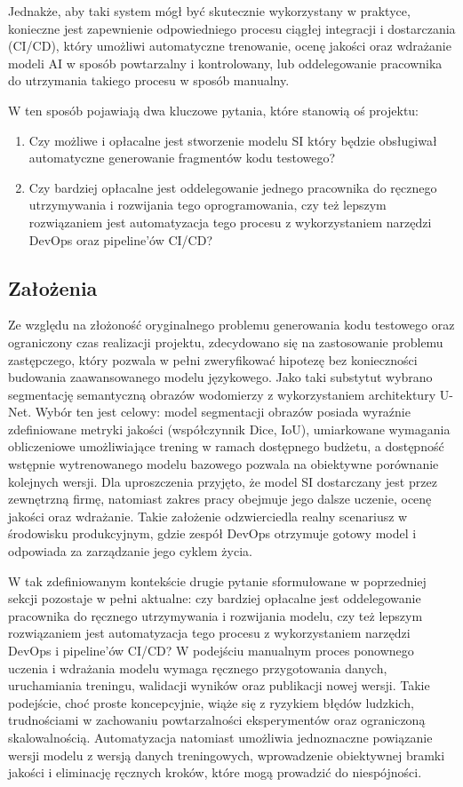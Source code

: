 Jednakże, aby taki system mógł być skutecznie wykorzystany w praktyce, konieczne jest zapewnienie odpowiedniego procesu ciągłej integracji i dostarczania (CI/CD), który umożliwi automatyczne trenowanie, ocenę jakości oraz wdrażanie modeli AI w sposób powtarzalny i kontrolowany, lub oddelegowanie pracownika do utrzymania takiego procesu w sposób manualny.

W ten sposób pojawiają dwa kluczowe pytania, które stanowią oś projektu:
\begin{enumerate}
  \item Czy możliwe i opłacalne jest stworzenie modelu SI który będzie obsługiwał automatyczne generowanie fragmentów kodu testowego?
  \item Czy bardziej opłacalne jest oddelegowanie jednego pracownika do ręcznego utrzymywania i rozwijania tego oprogramowania, czy też lepszym rozwiązaniem jest automatyzacja tego procesu z wykorzystaniem narzędzi DevOps oraz pipeline’ów CI/CD?
\end{enumerate}

\subsection{Założenia}

Ze względu na złożoność oryginalnego problemu generowania kodu testowego oraz ograniczony czas realizacji projektu, zdecydowano się na zastosowanie problemu zastępczego, który pozwala w pełni zweryfikować hipotezę bez konieczności budowania zaawansowanego modelu językowego. Jako taki substytut wybrano segmentację semantyczną obrazów wodomierzy z wykorzystaniem architektury U-Net. Wybór ten jest celowy: model segmentacji obrazów posiada wyraźnie zdefiniowane metryki jakości (współczynnik Dice, IoU), umiarkowane wymagania obliczeniowe umożliwiające trening w ramach dostępnego budżetu, a dostępność wstępnie wytrenowanego modelu bazowego pozwala na obiektywne porównanie kolejnych wersji. Dla uproszczenia przyjęto, że model SI dostarczany jest przez zewnętrzną firmę, natomiast zakres pracy obejmuje jego dalsze uczenie, ocenę jakości oraz wdrażanie. Takie założenie odzwierciedla realny scenariusz w środowisku produkcyjnym, gdzie zespół DevOps otrzymuje gotowy model i odpowiada za zarządzanie jego cyklem życia.

W tak zdefiniowanym kontekście drugie pytanie sformułowane w poprzedniej sekcji pozostaje w pełni aktualne: czy bardziej opłacalne jest oddelegowanie pracownika do ręcznego utrzymywania i rozwijania modelu, czy też lepszym rozwiązaniem jest automatyzacja tego procesu z wykorzystaniem narzędzi DevOps i pipeline'ów CI/CD? W podejściu manualnym proces ponownego uczenia i wdrażania modelu wymaga ręcznego przygotowania danych, uruchamiania treningu, walidacji wyników oraz publikacji nowej wersji. Takie podejście, choć proste koncepcyjnie, wiąże się z ryzykiem błędów ludzkich, trudnościami w zachowaniu powtarzalności eksperymentów oraz ograniczoną skalowalnością. Automatyzacja natomiast umożliwia jednoznaczne powiązanie wersji modelu z wersją danych treningowych, wprowadzenie obiektywnej bramki jakości i eliminację ręcznych kroków, które mogą prowadzić do niespójności.


